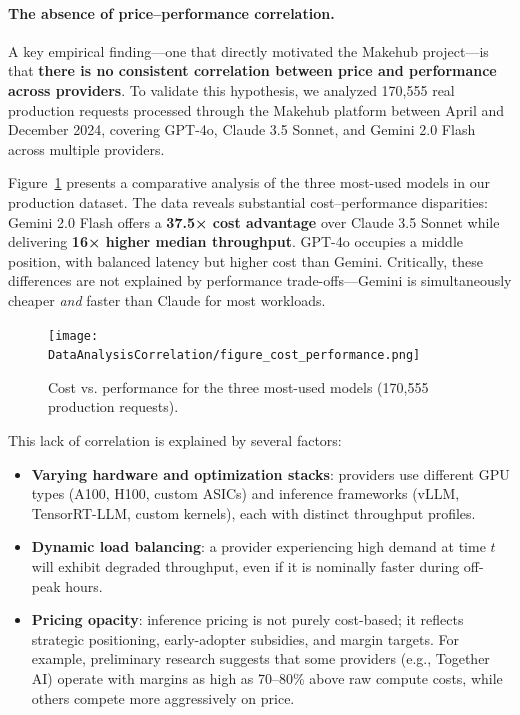 \documentclass[english]{article}
\begin{document}
\paragraph{The absence of price–performance correlation.}

A key empirical finding—one that directly motivated the Makehub project—is that \textbf{there is no consistent correlation between price and performance across providers}. To validate this hypothesis, we analyzed 170,555 real production requests processed through the Makehub platform between April and December 2024, covering GPT-4o, Claude 3.5 Sonnet, and Gemini 2.0 Flash across multiple providers.

Figure~\ref{fig:cost_performance_comparison} presents a comparative analysis of the three most-used models in our production dataset. The data reveals substantial cost–performance disparities: Gemini 2.0 Flash offers a \textbf{37.5× cost advantage} over Claude 3.5 Sonnet while delivering \textbf{16× higher median throughput}. GPT-4o occupies a middle position, with balanced latency but higher cost than Gemini. Critically, these differences are not explained by performance trade-offs—Gemini is simultaneously cheaper \emph{and} faster than Claude for most workloads.

\begin{figure}[H]
\centering
\texttt{[image: DataAnalysisCorrelation/figure\_cost\_performance.png]}
\caption{Cost vs. performance for the three most-used models (170,555 production requests).}
\label{fig:cost_performance_comparison}
\end{figure}

This lack of correlation is explained by several factors:
\begin{itemize}
    \item \textbf{Varying hardware and optimization stacks}: providers use different GPU types (A100, H100, custom ASICs) and inference frameworks (vLLM, TensorRT-LLM, custom kernels), each with distinct throughput profiles.
    \item \textbf{Dynamic load balancing}: a provider experiencing high demand at time $t$ will exhibit degraded throughput, even if it is nominally faster during off-peak hours.
    \item \textbf{Pricing opacity}: inference pricing is not purely cost-based; it reflects strategic positioning, early-adopter subsidies, and margin targets. For example, preliminary research suggests that some providers (e.g., Together AI) operate with margins as high as 70--80\% above raw compute costs, while others compete more aggressively on price.
\end{itemize}
\end{document}
